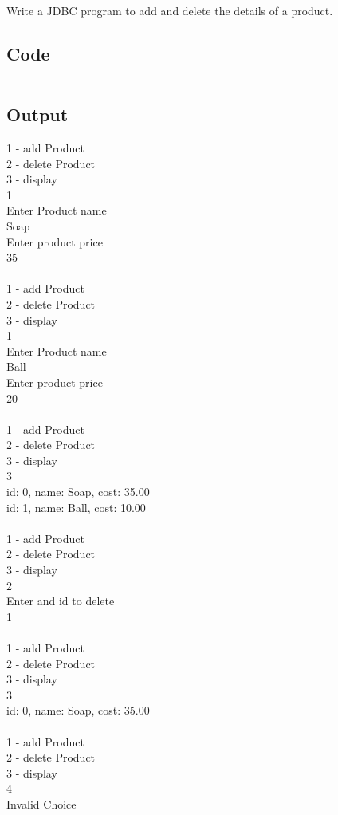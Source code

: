 \documentclass[../main.tex]{subfiles}
\begin{document}
Write a JDBC program to add and delete the details of a product.

\subsection{Code}
\inputminted[frame=lines, breaklines, breakanywhere, numberblanklines=false]{java}{./programs/prog24/Product.java}

\newpage
\subsection{Output}
1 - add Product \\
2 - delete Product \\
3 - display \\
1 \\
Enter Product name \\
Soap \\
Enter product price \\
35 \\
\\
1 - add Product \\
2 - delete Product \\
3 - display \\
1 \\
Enter Product name \\
Ball \\
Enter product price \\
20 \\
\\
1 - add Product \\
2 - delete Product \\
3 - display \\
3 \\
id: 0, name: Soap, cost: 35.00 \\
id: 1, name: Ball, cost: 10.00 \\
\\
1 - add Product \\
2 - delete Product \\
3 - display \\
2 \\
Enter and id to delete \\
1 \\
\\
1 - add Product \\
2 - delete Product \\
3 - display \\
3 \\
id: 0, name: Soap, cost: 35.00 \\
\\
1 - add Product \\
2 - delete Product \\
3 - display \\
4 \\
Invalid Choice \\
\end{document}
